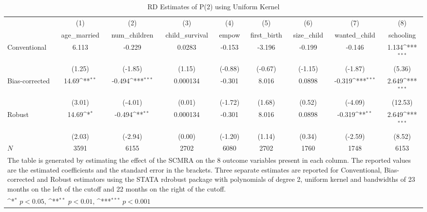 \begin{table}[htbp]\centering
\def\sym#1{\ifmmode^{#1}\else\(^{#1}\)\fi}
\caption{RD Estimates of P(2) using Uniform Kernel}
\begin{tabular}{l*{8}{c}}
\toprule
            &\multicolumn{1}{c}{(1)}&\multicolumn{1}{c}{(2)}&\multicolumn{1}{c}{(3)}&\multicolumn{1}{c}{(4)}&\multicolumn{1}{c}{(5)}&\multicolumn{1}{c}{(6)}&\multicolumn{1}{c}{(7)}&\multicolumn{1}{c}{(8)}\\
            &\multicolumn{1}{c}{age\_married}&\multicolumn{1}{c}{num\_children}&\multicolumn{1}{c}{child\_survival}&\multicolumn{1}{c}{empow}&\multicolumn{1}{c}{first\_birth}&\multicolumn{1}{c}{size\_child}&\multicolumn{1}{c}{wanted\_child}&\multicolumn{1}{c}{schooling}\\
\midrule
Conventional&       6.113         &      -0.229         &      0.0283         &      -0.153         &      -3.196         &      -0.199         &      -0.146         &       1.134\sym{***}\\
            &      (1.25)         &     (-1.85)         &      (1.15)         &     (-0.88)         &     (-0.67)         &     (-1.15)         &     (-1.87)         &      (5.36)         \\
\addlinespace
Bias-corrected&       14.69\sym{**} &      -0.494\sym{***}&    0.000134         &      -0.301         &       8.016         &      0.0898         &      -0.319\sym{***}&       2.649\sym{***}\\
            &      (3.01)         &     (-4.01)         &      (0.01)         &     (-1.72)         &      (1.68)         &      (0.52)         &     (-4.09)         &     (12.53)         \\
\addlinespace
Robust      &       14.69\sym{*}  &      -0.494\sym{**} &    0.000134         &      -0.301         &       8.016         &      0.0898         &      -0.319\sym{**} &       2.649\sym{***}\\
            &      (2.03)         &     (-2.94)         &      (0.00)         &     (-1.20)         &      (1.14)         &      (0.34)         &     (-2.59)         &      (8.52)         \\
\midrule
\(N\)       &        3591         &        6155         &        2702         &        6080         &        2702         &        1760         &        1748         &        6153         \\
\bottomrule
\multicolumn{9}{l}{\footnotesize The table is generated by estimating the effect of the SCMRA on the 8 outcome variables present in each column. The reported values are the estimated coefficients and the standard error in the brackets. Three separate estimates are reported for Conventional, Bias-corrected and Robust estimators using the STATA rdrobust package with polynomials of degree 2, uniform kernel and bandwidths of 23 months on the left of the cutoff and 22 months on the right of the cutoff.}\\
\multicolumn{9}{l}{\footnotesize \sym{*} \(p<0.05\), \sym{**} \(p<0.01\), \sym{***} \(p<0.001\)}\\
\end{tabular}
\end{table}
